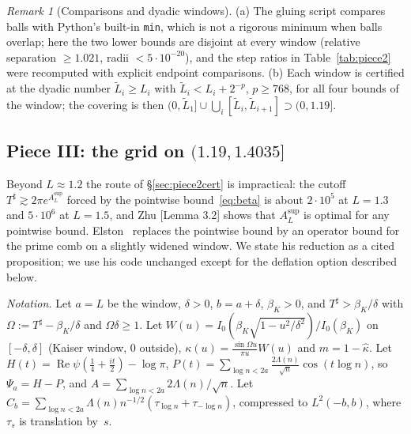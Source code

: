 \documentclass[11pt]{amsart}
\newcommand{\Lmax}{1.4035}                                %
\newcommand{\re}{\operatorname{Re}}
\newcommand{\Tsh}{T^{\sharp}}
\newcommand{\e}[1]{\cdot 10^{#1}}
\theoremstyle{definition}
\theoremstyle{remark}
\newtheorem{remark}[theorem]{Remark}
\numberwithin{equation}{section}
\begin{document}
\begin{remark}[Comparisons and dyadic windows]
(a) The gluing script compares balls with Python's built-in \texttt{min}, which is not a rigorous minimum when balls overlap; here the two lower bounds are disjoint at every window (relative separation $\ge1.021$, radii $<5\e{-20}$), and the step ratios in Table~\ref{tab:piece2} were recomputed with explicit endpoint comparisons. (b) Each window is certified at the dyadic number $\tilde L_i\ge L_i$ with $\tilde L_i<L_i+2^{-p}$, $p\ge768$, for all four bounds of the window; the covering is then $(0,\tilde L_1]\cup\bigcup_i[\tilde L_i,\tilde L_{i+1}]\supset(0,1.19]$.
\end{remark}

\subsection{Piece III: the grid on $(1.19,\Lmax]$}\label{sec:piece3}
Beyond $L\approx1.2$ the route of \S\ref{sec:piece2cert} is impractical: the cutoff $\Tsh\gtrsim2\pi e^{A_L^{\sup}}$ forced by the pointwise bound~\eqref{eq:beta} is about $2\cdot10^5$ at $L=1.3$ and $5\cdot10^6$ at $L=1.5$, and Zhu [Lemma 3.2] shows that $A_L^{\sup}$ is optimal for any pointwise bound. Elston~\cite{Elston} replaces the pointwise bound by an operator bound for the prime comb on a slightly widened window. We state his reduction as a cited proposition; we use his code unchanged except for the deflation option described below.

\emph{Notation.} Let $a=L$ be the window, $\delta>0$, $b=a+\delta$, $\beta_K>0$, and $\Tsh>\beta_K/\delta$ with $\Omega:=\Tsh-\beta_K/\delta$ and $\Omega\delta\ge1$. Let $W(u)=I_0(\beta_K\sqrt{1-u^2/\delta^2})/I_0(\beta_K)$ on $[-\delta,\delta]$ (Kaiser window, $0$ outside), $\kappa(u)=\frac{\sin\Omega u}{\pi u}W(u)$ and $m=1-\hat\kappa$. Let $H(t)=\re\psi(\tfrac14+\tfrac{it}2)-\log\pi$, $P(t)=\sum_{\log n<2a}\frac{2\Lambda(n)}{\sqrt n}\cos(t\log n)$, so $\Psi_a=H-P$, and $A=\sum_{\log n<2a}2\Lambda(n)/\sqrt n$. Let $C_b=\sum_{\log n<2a}\Lambda(n)n^{-1/2}(\tau_{\log n}+\tau_{-\log n})$, compressed to $L^2(-b,b)$, where $\tau_s$ is translation by~$s$.
\end{document}
